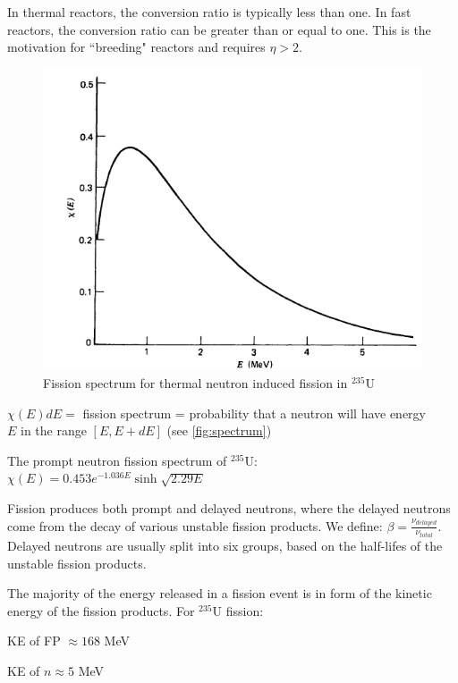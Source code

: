 \documentclass[12pt]{article}
\newif\ifeqns
\begin{document}
In thermal reactors, the conversion ratio is typically less than one. In fast reactors, the conversion ratio can be greater than or equal to one. This is the motivation for ``breeding" reactors and requires $\eta >2$.

\begin{figure}
\begin{center}
\includegraphics[scale=0.6]{../figs/fissionspectrum}
\caption{Fission spectrum for thermal neutron induced fission in $^235$U}
\label{fig:spectrum}
\end{center}
\end{figure}
%
$\chi(E)dE=$ fission spectrum = probability that a neutron will have energy\\ $E$ in the range $[E, E+dE]$ (see \autoref{fig:spectrum})

The prompt neutron fission spectrum of $^{235}$U: $\chi(E) = 0.453 e^{-1.036E}\sinh\sqrt{2.29E}$

Fission produces both prompt and delayed neutrons, where the delayed neutrons come from the decay of various unstable fission products. We define: $\beta=\frac{\nu_{delayed}}{\nu_{total}}$. Delayed neutrons are usually split into six groups, based on the half-lifes of the unstable fission products.

The majority of the energy released in a fission event is in form of the kinetic energy of the fission products. For $^{235}$U fission:

\ifeqns
KE of FP $\approx 168$ MeV

KE of $n\approx 5$ MeV
\end{document}

